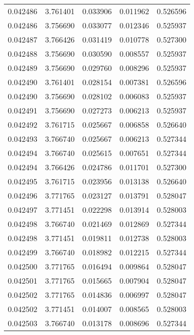\begin{tabular}{lrrrr}
0.042486    &  3.761401 &  0.033906 &  0.011962 &             0.526596 \\
0.042486    &  3.756690 &  0.033077 &  0.012346 &             0.525937 \\
0.042487    &  3.766426 &  0.031419 &  0.010778 &             0.527300 \\
0.042488    &  3.756690 &  0.030590 &  0.008557 &             0.525937 \\
0.042489    &  3.756690 &  0.029760 &  0.008296 &             0.525937 \\
0.042490    &  3.761401 &  0.028154 &  0.007381 &             0.526596 \\
0.042490    &  3.756690 &  0.028102 &  0.006083 &             0.525937 \\
0.042491    &  3.756690 &  0.027273 &  0.006213 &             0.525937 \\
0.042492    &  3.761715 &  0.025667 &  0.006858 &             0.526640 \\
0.042493    &  3.766740 &  0.025667 &  0.006213 &             0.527344 \\
0.042494    &  3.766740 &  0.025615 &  0.007651 &             0.527344 \\
0.042494    &  3.766426 &  0.024786 &  0.011701 &             0.527300 \\
0.042495    &  3.761715 &  0.023956 &  0.013138 &             0.526640 \\
0.042496    &  3.771765 &  0.023127 &  0.013791 &             0.528047 \\
0.042497    &  3.771451 &  0.022298 &  0.013914 &             0.528003 \\
0.042498    &  3.766740 &  0.021469 &  0.012869 &             0.527344 \\
0.042498    &  3.771451 &  0.019811 &  0.012738 &             0.528003 \\
0.042499    &  3.766740 &  0.018982 &  0.012215 &             0.527344 \\
0.042500    &  3.771765 &  0.016494 &  0.009864 &             0.528047 \\
0.042501    &  3.771765 &  0.015665 &  0.007904 &             0.528047 \\
0.042502    &  3.771765 &  0.014836 &  0.006997 &             0.528047 \\
0.042502    &  3.771451 &  0.014007 &  0.008565 &             0.528003 \\
0.042503    &  3.766740 &  0.013178 &  0.008696 &             0.527344 \\

\end{tabular}
